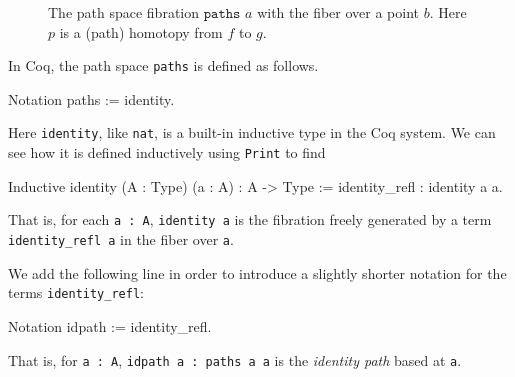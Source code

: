 \begin{figure}[ht]
 \label{fig:paths}
  \caption{The path space fibration $\texttt{paths }a$ with the fiber
    over a point $b$.  Here $p$ is a (path) homotopy from $f$ to $g$.}
\end{figure}
In Coq, the path space \verb|paths| is defined as follows.
\begin{center}
\begin{coqcode}
Notation paths := identity.
\end{coqcode}
\end{center}
Here \verb|identity|, like \verb|nat|, is a built-in
inductive type in the Coq system.  We can see how it is defined
inductively using \verb|Print| to find
\begin{center}
  \begin{coqcode}
Inductive identity (A : Type) (a : A) : A -> Type :=
 identity_refl : identity a a.
  \end{coqcode}
\end{center}
That is, for each \verb|a : A|, \verb|identity a| is the
fibration freely generated by a term \verb|identity_refl a| in
the fiber over \verb|a|.  

We add the following line in order to introduce a
slightly shorter notation for the terms \verb|identity_refl|:
\begin{center}
  \begin{coqcode}
Notation idpath := identity_refl.
  \end{coqcode}
\end{center}
That is, for \verb|a : A|, \verb|idpath a : paths a a| is
the \emph{identity path} based at \verb|a|.

